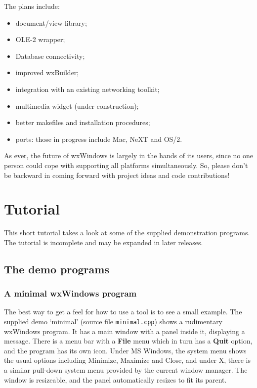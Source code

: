 The plans include:

\begin{itemize}
\itemsep=0pt
\item document/view library;
\item OLE-2 wrapper;
\item Database connectivity;
\item improved wxBuilder;
\item integration with an existing networking toolkit;
\item multimedia widget (under construction);
\item better makefiles and installation procedures;
\item ports: those in progress include Mac, NeXT and OS/2.
\end{itemize}

As ever, the future of wxWindows is largely in the hands of
its users, since no one person could cope with supporting
all platforms simultaneously. So, please don't be backward
in coming forward with project ideas and code contributions!

\chapter{Tutorial}\label{tutorial}
%
\setfooter{\thepage}{}{}{}{}{\thepage}%

This short tutorial takes a look at some of the supplied demonstration
programs.  The tutorial is incomplete and may be expanded in later
releases.

\section{The demo programs}

\subsection{A minimal wxWindows program}

The best way to get a feel for how to use a tool is to see a small
example.  The supplied demo `minimal' (source file {\tt minimal.cpp})
shows a rudimentary wxWindows program. It has a main window with a panel
inside it, displaying a message. There is a menu bar with a {\bf File} menu
which in turn has a {\bf Quit} option, and the program has its own icon. Under
MS Windows, the system menu shows the usual options including Minimize,
Maximize and Close, and under X, there is a similar pull-down system
menu provided by the current window manager. The window is resizeable,
and the panel automatically resizes to fit its parent.

